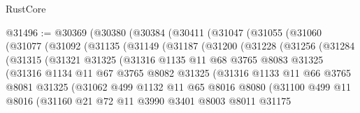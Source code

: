 \begin{lexlean}{RustCore}
\begin{coremodule}
@31496 := @30369
    (@30380
      (@30384
        (@30411
          (@31047
            (@31055
              (@31060
                (@31077
                  (@31092
                    (@31135
                      (@31149
                        (@31187
                          (@31200
                            (@31228
                              (@31256
                                (@31284
                                  (@31315
                                    (@31321
                                      @31325
                                      (@31316
                                        @1135
                                        @11
                                        @68
                                        @3765
                                        @8083
                                        @31325
                                        (@31316
                                          @1134
                                          @11
                                          @67
                                          @3765
                                          @8082
                                          @31325
                                          (@31316
                                            @1133
                                            @11
                                            @66
                                            @3765
                                            @8081
                                            @31325
                                            (@31062
                                              @499
                                              @1132
                                              @11
                                              @65
                                              @8016
                                              @8080
                                              (@31100
                                                @499
                                                @11
                                                @8016
                                                (@31160
                                                  @21
                                                  @72
                                                  @11
                                                  @3990
                                                  @3401
                                                  @8003
                                                  @8011
                                                  @31175

\end{coremodule}
\end{lexlean}
